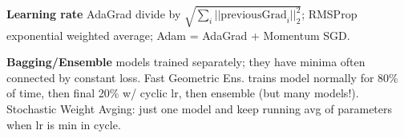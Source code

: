 \textbf{Learning rate} AdaGrad divide by $\sqrt{\sum_i ||\text{previousGrad}_i||_2^2}$; RMSProp exponential weighted average; Adam = AdaGrad + Momentum SGD.

\textbf{Bagging/Ensemble} models trained separately; they have minima often connected by constant loss. Fast Geometric Ens. trains model normally for 80\% of time, then final 20\% w/ cyclic lr, then ensemble (but many models!). Stochastic Weight Avging: just one model and keep running avg of parameters when lr is min in cycle.
